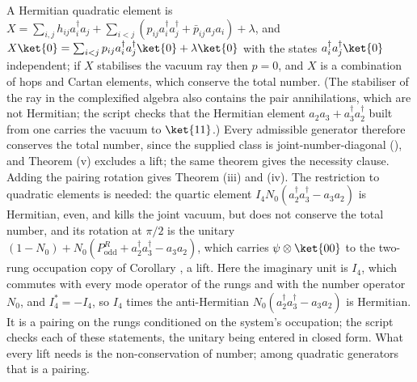 A Hermitian quadratic element is $X = \sum_{i,j} h_{ij}a^{\dagger}_{i}a_{j} + \sum_{i<j} (p_{ij}a^{\dagger}_{i}a^{\dagger}_{j} + \bar{p}_{ij}a_{j}a_{i}) + \lambda$, and $X\ket{0} = \sum_{i<j} p_{ij}a^{\dagger}_{i}a^{\dagger}_{j}\ket{0} + \lambda\ket{0}$ with the states $a^{\dagger}_{i}a^{\dagger}_{j}\ket{0}$ independent; if $X$ stabilises the vacuum ray then $p = 0$, and $X$ is a combination of hops and Cartan elements, which conserve the total number. (The stabiliser of the ray in the complexified algebra also contains the pair annihilations, which are not Hermitian; the script checks that the Hermitian element $a_{2}a_{3} + a^{\dagger}_{3}a^{\dagger}_{2}$ built from one carries the vacuum to $\ket{11}$.) Every admissible generator therefore conserves the total number, since the supplied class is joint-number-diagonal (), and Theorem (v) excludes a lift; the same theorem gives the necessity clause. Adding the pairing rotation gives Theorem (iii) and (iv). The restriction to quadratic elements is needed: the quartic element $I_{4}N_{0}(a^{\dagger}_{2}a^{\dagger}_{3} - a_{3}a_{2})$ is Hermitian, even, and kills the joint vacuum, but does not conserve the total number, and its rotation at $\pi/2$ is the unitary $(1 - N_{0}) + N_{0}(P^{R}_{\mathrm{odd}} + a^{\dagger}_{2}a^{\dagger}_{3} - a_{3}a_{2})$, which carries $\psi \otimes \ket{00}$ to the two-rung occupation copy of Corollary , a lift. Here the imaginary unit is $I_{4}$, which commutes with every mode operator of the rungs and with the number operator $N_{0}$, and $I_{4}^{*} = -I_{4}$, so $I_{4}$ times the anti-Hermitian $N_{0}(a^{\dagger}_{2}a^{\dagger}_{3} - a_{3}a_{2})$ is Hermitian. It is a pairing on the rungs conditioned on the system's occupation; the script checks each of these statements, the unitary being entered in closed form. What every lift needs is the non-conservation of number; among quadratic generators that is a pairing.
